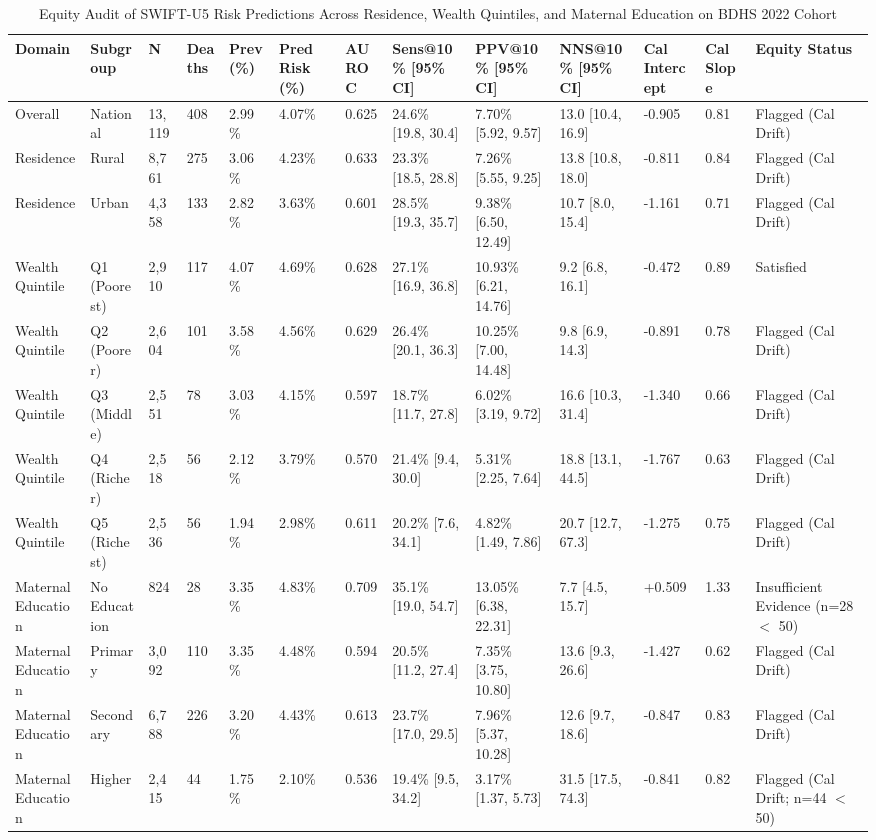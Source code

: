 \begin{table}[htbp]
\centering
\small
\begin{tabular}{lllllllllllll}
\toprule
Domain & Subgroup & N & Deaths & Prev (\%) & Pred Risk (\%) & AUROC & Sens@10\% [95\% CI] & PPV@10\% [95\% CI] & NNS@10\% [95\% CI] & Cal Intercept & Cal Slope & Equity Status \\
\midrule
Overall & National & 13,119 & 408 & 2.99\% & 4.07\% & 0.625 & 24.6\% [19.8, 30.4] & 7.70\% [5.92, 9.57] & 13.0 [10.4, 16.9] & -0.905 & 0.81 & Flagged (Cal Drift) \\
Residence & Rural & 8,761 & 275 & 3.06\% & 4.23\% & 0.633 & 23.3\% [18.5, 28.8] & 7.26\% [5.55, 9.25] & 13.8 [10.8, 18.0] & -0.811 & 0.84 & Flagged (Cal Drift) \\
Residence & Urban & 4,358 & 133 & 2.82\% & 3.63\% & 0.601 & 28.5\% [19.3, 35.7] & 9.38\% [6.50, 12.49] & 10.7 [8.0, 15.4] & -1.161 & 0.71 & Flagged (Cal Drift) \\
Wealth Quintile & Q1 (Poorest) & 2,910 & 117 & 4.07\% & 4.69\% & 0.628 & 27.1\% [16.9, 36.8] & 10.93\% [6.21, 14.76] & 9.2 [6.8, 16.1] & -0.472 & 0.89 & Satisfied \\
Wealth Quintile & Q2 (Poorer) & 2,604 & 101 & 3.58\% & 4.56\% & 0.629 & 26.4\% [20.1, 36.3] & 10.25\% [7.00, 14.48] & 9.8 [6.9, 14.3] & -0.891 & 0.78 & Flagged (Cal Drift) \\
Wealth Quintile & Q3 (Middle) & 2,551 & 78 & 3.03\% & 4.15\% & 0.597 & 18.7\% [11.7, 27.8] & 6.02\% [3.19, 9.72] & 16.6 [10.3, 31.4] & -1.340 & 0.66 & Flagged (Cal Drift) \\
Wealth Quintile & Q4 (Richer) & 2,518 & 56 & 2.12\% & 3.79\% & 0.570 & 21.4\% [9.4, 30.0] & 5.31\% [2.25, 7.64] & 18.8 [13.1, 44.5] & -1.767 & 0.63 & Flagged (Cal Drift) \\
Wealth Quintile & Q5 (Richest) & 2,536 & 56 & 1.94\% & 2.98\% & 0.611 & 20.2\% [7.6, 34.1] & 4.82\% [1.49, 7.86] & 20.7 [12.7, 67.3] & -1.275 & 0.75 & Flagged (Cal Drift) \\
Maternal Education & No Education & 824 & 28 & 3.35\% & 4.83\% & 0.709 & 35.1\% [19.0, 54.7] & 13.05\% [6.38, 22.31] & 7.7 [4.5, 15.7] & +0.509 & 1.33 & Insufficient Evidence (n=28 $<$ 50) \\
Maternal Education & Primary & 3,092 & 110 & 3.35\% & 4.48\% & 0.594 & 20.5\% [11.2, 27.4] & 7.35\% [3.75, 10.80] & 13.6 [9.3, 26.6] & -1.427 & 0.62 & Flagged (Cal Drift) \\
Maternal Education & Secondary & 6,788 & 226 & 3.20\% & 4.43\% & 0.613 & 23.7\% [17.0, 29.5] & 7.96\% [5.37, 10.28] & 12.6 [9.7, 18.6] & -0.847 & 0.83 & Flagged (Cal Drift) \\
Maternal Education & Higher & 2,415 & 44 & 1.75\% & 2.10\% & 0.536 & 19.4\% [9.5, 34.2] & 3.17\% [1.37, 5.73] & 31.5 [17.5, 74.3] & -0.841 & 0.82 & Flagged (Cal Drift; n=44 $<$ 50) \\
\bottomrule
\end{tabular}
\caption{Equity Audit of SWIFT-U5 Risk Predictions Across Residence, Wealth Quintiles, and Maternal Education on BDHS 2022 Cohort}
\label{tab:equity_audit}
\end{table}
